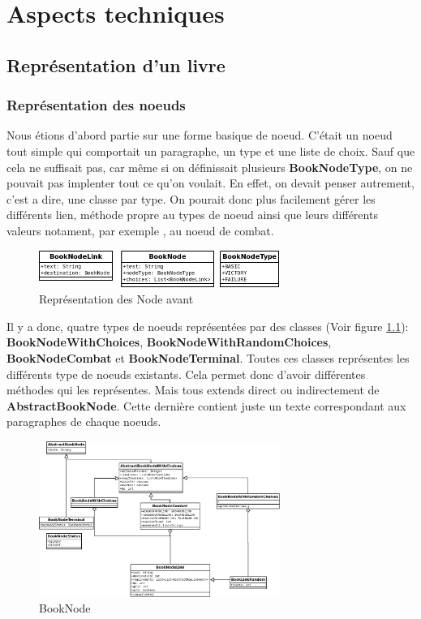 \chapter{Aspects techniques}

	\section{Représentation d'un livre}

		\subsection{Représentation des noeuds}
			Nous étions d'abord partie sur une forme basique de noeud. C'était un noeud tout simple qui comportait un paragraphe, un type et une liste de choix. Sauf que cela ne suffisait pas, car même si on définissait plusieurs \textbf{BookNodeType}, on ne pouvait pas implenter tout ce qu'on voulait. En effet, on devait penser autrement, c'est a dire, une classe par type. On pourait donc plus facilement gérer les différents lien, méthode propre au types de noeud ainsi que leurs différents valeurs notament, par exemple , au noeud de combat.

			\begin{figure}[H]
				\centering\includegraphics[width=0.70\textwidth]{img/BookNodeBefore.png}
				\caption{Représentation des Node avant}
			\end{figure}

			Il y a donc, quatre types de noeuds représentées par des classes (Voir figure \ref{fig:BookNode}): \textbf{BookNodeWithChoices}, \textbf{BookNodeWithRandomChoices}, \textbf{BookNodeCombat} et \textbf{BookNodeTerminal}. Toutes ces classes représentes les différents type de noeuds existants. Cela permet donc d'avoir différentes méthodes qui les représentes. Mais tous extends direct ou indirectement de \textbf{AbstractBookNode}. Cette dernière contient juste un texte correspondant aux paragraphes de chaque noeuds.

			\begin{figure}[H]
				\centering\includegraphics[width=0.70\textwidth]{img/BookNode.png}
				\caption{BookNode}
				\label{fig:BookNode}
			\end{figure}


